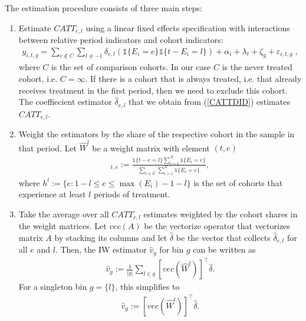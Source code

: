 The estimation procedure consists of three main steps:
\begin{enumerate}
	\item Estimate $CATT_{e, l}$ using a linear fixed effects specification with interactions between relative period indicators and cohort indicators:
	\begin{align} \label{CATTDID}
		y_{i, t, g} = \sum_{e \notin C}^{}\sum_{l \neq -1}^{} \delta_{e, l} (\mathds{1}\{E_i = e\} \mathds{1}\{t - E_i = l\}) + \alpha_i + \lambda_t + \zeta_g + \varepsilon_{i, t, g} \;,
	\end{align}
	where $C$ is the set of comparison cohorts. In our case $C$ is the never treated cohort, i.e. $C = {\infty}$. If there is a cohort that is always treated, i.e. that already receives treatment in the first period, then we need to exclude this cohort. The coeffiecient estimator $\widehat{\delta}_{e, l}$ that we obtain from (\ref{CATTDID}) estimates $CATT_{e, l}$.
	
	\item Weight the estimators by the share of the respective cohort in the sample in that period. Let $\hat{W}^l$ be a weight matrix with element $(t, e)$
	\begin{align*}
		[\widehat{W}^l]_{t, e} := \frac{\mathds{1}\{t - e = l\} \sum_{i = 1}^{N} \mathds{1}\{E_i = e\}}{\sum_{e \in h^{l}} \sum_{i = 1}^{N} \mathds{1}\{E_i = e\}},
	\end{align*}
	where $h^{l} := \{e: 1 - l \leq e \leq \max(E_i) - 1 - l\}$ is the set of cohorts that experience at least $l$ periods of treatment.
	
	\item Take the average over all $CATT_{e, l}$ estimates weighted by the cohort shares in the weight matrices. Let $vec(A)$ be the vectorize operator that vectorizes matrix $A$ by stacking its columns and let $\widehat{\delta}$ be the vector that collects $\widehat{\delta}_{e, l}$ for all $e$ and $l$. Then, the IW estimator $\widehat{v}_g$ for bin $g$ can be written as 
	\begin{align}
		\widehat{v}_g := \frac{1}{|g|} \sum_{l \in g} [vec(\widehat{W}^l)]^\intercal \widehat{\delta}.
	\end{align}
	For a singleton bin $g = \{l\}$, this simplifies to
	\begin{align*}
		\widehat{v}_{g} := [vec(\widehat{W}^l)]^\intercal \widehat{\delta}.
	\end{align*}
	
\end{enumerate}

